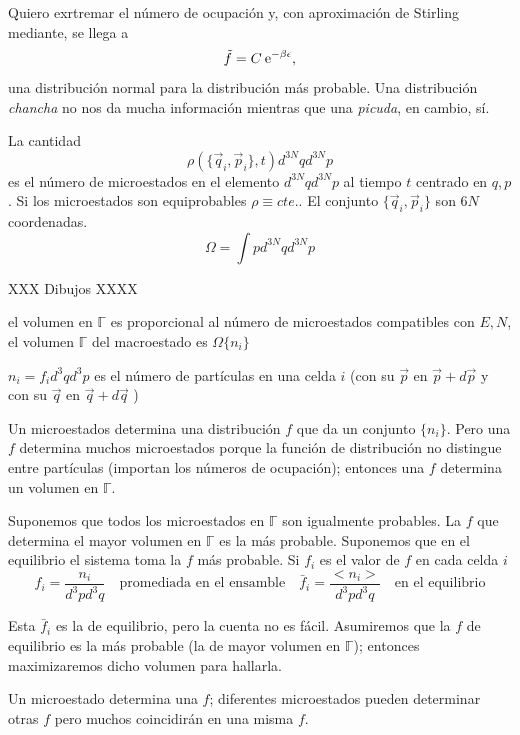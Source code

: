\documentclass[10pt,oneside]{CBFT_book}
\begin{document}
Quiero exrtremar el número de ocupación y, con aproximación de Stirling mediante, se llega a
\[
	\tilde{f} = C \:\mathrm{e}^{-\beta \epsilon},
\]
una distribución normal para la distribución más probable. Una distribución \textit{chancha} no nos da mucha
información mientras que una \textit{picuda}, en cambio, sí.

La cantidad
\[
	\rho(\{ \vec{q}_i, \vec{p}_i\},t) d^{3N}qd^{3N}p
\]
es el número de microestados en el elemento $d^{3N}qd^{3N}p$ al tiempo $t$ centrado en $q,p$.
Si los microestados son equiprobables $\rho \equiv cte.$. El conjunto $\{ \vec{q}_i, \vec{p}_i\}$ son
$6N$ coordenadas.
\[
	\Omega = \int p d^{3N}qd^{3N}p
\]

XXX Dibujos XXXX

el volumen en  $\mathbb{\Gamma}$ es proporcional al número de microestados compatibles con $E,N$,
el volumen $ \mathbb{\Gamma}$ del macroestado es $\Omega\{ n_i \}$

$n_i = f_i d^3q d^3p$ es el número de partículas en una celda $i$ (con su $\vec{p}$ en $\vec{p} + d\vec{p}$
y con su $\vec{q}$ en $\vec{q} + d\vec{q}$ )

Un microestados determina una distribución $f$ que da un conjunto $\{ n_i \}$. Pero una $f$ determina muchos
microestados porque la función de distribución no distingue entre partículas (importan los números de 
ocupación); entonces una $f$ determina un volumen en $\mathbb{\Gamma}$.

Suponemos que todos los microestados en $\mathbb{\Gamma}$ son igualmente probables.
La $f$ que determina el mayor volumen en  $\mathbb{\Gamma}$ es la más probable. Suponemos que en el 
equilibrio el sistema toma la $f$ más probable.
Si $f_i$ es el valor de $f$ en cada celda $i$
\[
	f_i = \frac{n_i}{d^3p d^3q} \quad \text{promediada en el ensamble} \quad \bar{f}_i =  \frac{<n_i>}{d^3p d^3q}
	\quad \text{en el equilibrio}
\]

Esta $\bar{f}_i$ es la de equilibrio, pero la cuenta no es fácil. Asumiremos que la $f$ de equilibrio es la más
probable (la de mayor volumen en  $\mathbb{\Gamma}$); entonces maximizaremos dicho volumen para hallarla.

Un microestado determina una $f$; diferentes microestados pueden determinar otras $f$ pero muchos coincidirán en
una misma $f$.
\end{document}

